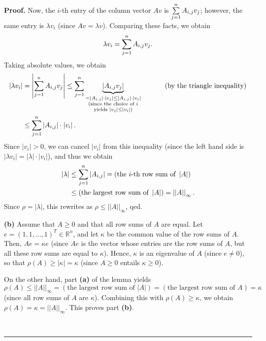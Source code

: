 \documentclass[numbers=enddot,12pt,final,onecolumn,notitlepage]{scrartcl}%
\numberwithin{exer}{subsection}
\theoremstyle{definition}
\newenvironment{proof}[1][Proof]{\noindent\textbf{#1.} }{\ \rule{0.5em}{0.5em}}
\let\sumnonlimits\sum
\renewcommand{\sum}{\sumnonlimits\limits}
\begin{document}
\begin{proof}
Now, the $i$-th entry of the column vector $Av$ is $\sum\limits_{j=1}%
^{n}A_{i,j}v_{j}$; however, the same entry is $\lambda v_{i}$ (since
$Av=\lambda v$). Comparing these facts, we obtain%
\[
\lambda v_{i}=\sum\limits_{j=1}^{n}A_{i,j}v_{j}.
\]
Taking absolute values, we obtain%
\begin{align*}
\left\vert \lambda v_{i}\right\vert  & =\left\vert \sum\limits_{j=1}%
^{n}A_{i,j}v_{j}\right\vert \leq\sum\limits_{j=1}^{n}\underbrace{\left\vert
A_{i,j}v_{j}\right\vert }_{\substack{=\left\vert A_{i,j}\right\vert
\cdot\left\vert v_{j}\right\vert \leq\left\vert A_{i,j}\right\vert
\cdot\left\vert v_{i}\right\vert \\\text{(since the choice of }i\\\text{yields
}\left\vert v_{j}\right\vert \leq\left\vert v_{i}\right\vert \text{)}%
}}\ \ \ \ \ \ \ \ \ \ \left(  \text{by the triangle inequality}\right)  \\
& \leq\sum\limits_{j=1}^{n}\left\vert A_{i,j}\right\vert \cdot\left\vert
v_{i}\right\vert .
\end{align*}
Since $\left\vert v_{i}\right\vert >0$, we can cancel $\left\vert
v_{i}\right\vert $ from this inequality (since the left hand side is
$\left\vert \lambda v_{i}\right\vert =\left\vert \lambda\right\vert
\cdot\left\vert v_{i}\right\vert $), and thus we obtain%
\begin{align*}
\left\vert \lambda\right\vert  & \leq\sum\limits_{j=1}^{n}\left\vert
A_{i,j}\right\vert =\left(  \text{the }i\text{-th row sum of }\left\vert
A\right\vert \right)  \\
& \leq\left(  \text{the largest row sum of }\left\vert A\right\vert \right)
=\left\vert \left\vert A\right\vert \right\vert _{\infty}.
\end{align*}
Since $\rho=\left\vert \lambda\right\vert $, this rewrites as $\rho
\leq\left\vert \left\vert A\right\vert \right\vert _{\infty}$, qed.

\textbf{(b)} Assume that $A\geq0$ and that all row sums of $A$ are equal. Let
$e=\left(  1,1,\ldots,1\right)  ^{T}\in\mathbb{R}^{n}$, and let $\kappa$ be
the common value of the row sums of $A$. Then, $Ae=\kappa e$ (since $Ae$ is
the vector whose entries are the row sums of $A$, but all these row sums are
equal to $\kappa$). Hence, $\kappa$ is an eigenvalue of $A$ (since $e\neq0$),
so that $\rho\left(  A\right)  \geq\left\vert \kappa\right\vert =\kappa$
(since $A\geq0$ entails $\kappa\geq0$).

On the other hand, part \textbf{(a)} of the lemma yields
\[
\rho\left(  A\right)  \leq\left\vert \left\vert A\right\vert \right\vert
_{\infty}=\left(  \text{the largest row sum of }\left\vert A\right\vert
\right)  =\left(  \text{the largest row sum of }A\right)  =\kappa
\]
(since all row sums of $A$ are $\kappa$). Combining this with $\rho\left(
A\right)  \geq\kappa$, we obtain $\rho\left(  A\right)  =\kappa=\left\vert
\left\vert A\right\vert \right\vert _{\infty}$. This proves part \textbf{(b)}.


\end{proof}
\end{document}
